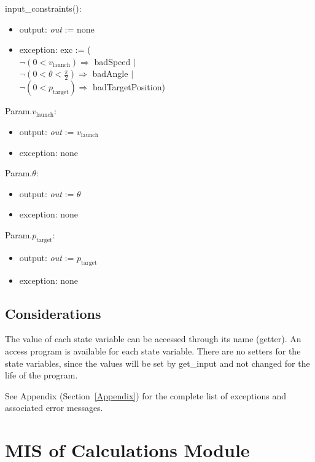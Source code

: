 \documentclass[12pt, titlepage]{article}
\begin{document}
\noindent input\_constraints():
\begin{itemize}
\item output: \textit{out} := none
\item exception: exc := ( \\
$\neg (0 < v_{\text{launch}}) \Rightarrow$ badSpeed $|$\\
$\neg (0 < \theta < \frac{\pi}{2}) \Rightarrow$ badAngle $|$\\
$\neg (0 < p_{\text{target}}) \Rightarrow$ badTargetPosition)
\end{itemize}
 
\noindent Param.$v_{\text{launch}}$:
\begin{itemize}
\item output: \textit{out} := $v_{\text{launch}}$
\item exception: none
\end{itemize}

\noindent Param.$\theta$:
\begin{itemize}
\item output: \textit{out} := $\theta$
\item exception: none
\end{itemize}

\noindent Param.$p_{\text{target}}$:
\begin{itemize}
\item output: \textit{out} := $p_{\text{target}}$
\item exception: none
\end{itemize}

\subsection{Considerations}

The value of each state variable can be accessed through its name (getter).  An
access program is available for each state variable.  There are no setters for
the state variables, since the values will be set by get\_input and
not changed for the life of the program.

See Appendix (Section~\ref{Appendix}) for the complete list of exceptions and
 associated error messages.

\newpage

\section{MIS of Calculations Module} \label{Calc}
\end{document}
